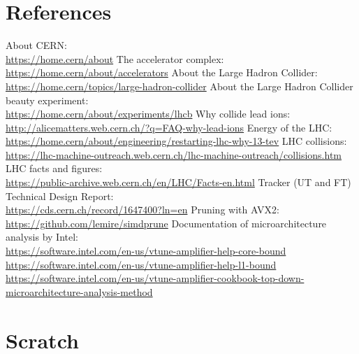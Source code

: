 \documentclass[12pt]{article}
\begin{document}
\section{References}

\begin{thebibliography}{asd}
	 About CERN: \\
		\url{https://home.cern/about}
	 The accelerator complex: \\
		\url{https://home.cern/about/accelerators}
	 About the Large Hadron Collider: \\
		\url{https://home.cern/topics/large-hadron-collider}
	 About the Large Hadron Collider beauty experiment: \\
		\url{https://home.cern/about/experiments/lhcb}
	 Why collide lead ions: \\
		\url{http://alicematters.web.cern.ch/?q=FAQ-why-lead-ions}
	 Energy of the LHC: \\
		\url{https://home.cern/about/engineering/restarting-lhc-why-13-tev}
	 LHC collisions: \\
		\url{https://lhc-machine-outreach.web.cern.ch/lhc-machine-outreach/collisions.htm}
	 LHC facts and figures: \\
		\url{https://public-archive.web.cern.ch/en/LHC/Facts-en.html}
	 Tracker (UT and FT) Technical Design Report: \\
		\url{https://cds.cern.ch/record/1647400?ln=en}
	 Pruning with AVX2: \\
		\url{https://github.com/lemire/simdprune} 
	 Documentation of microarchitecture analysis by Intel: \\
		\url{https://software.intel.com/en-us/vtune-amplifier-help-core-bound}\\
		\url{https://software.intel.com/en-us/vtune-amplifier-help-l1-bound}\\
		\url{https://software.intel.com/en-us/vtune-amplifier-cookbook-top-down-microarchitecture-analysis-method}
\end{thebibliography}


\newpage
\section{Scratch}
\end{document}

